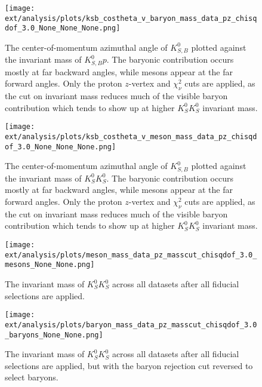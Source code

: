 \begin{figure}
  \begin{center}
    \texttt{[image: ext/analysis/plots/ksb\_costheta\_v\_baryon\_mass\_data\_pz\_chisqdof\_3.0\_None\_None\_None.png]}
  \end{center}
  \caption{The center-of-momentum azimuthal angle of $K_{S,B}^0$ plotted against the invariant mass of $K_{S,B}^0 p$. The baryonic contribution occurs mostly at far backward angles, while mesons appear at the far forward angles. Only the proton $z$-vertex and $\chi^2_\nu$ cuts are applied, as the cut on invariant mass reduces much of the visible baryon contribution which tends to show up at higher $K_S^0K_S^0$ invariant mass.}\label{fig:ksb-costheta-v-baryon-mass-data-pz-chisqdof-3.0}
\end{figure}

\begin{figure}
  \begin{center}
    \texttt{[image: ext/analysis/plots/ksb\_costheta\_v\_meson\_mass\_data\_pz\_chisqdof\_3.0\_None\_None\_None.png]}
  \end{center}
  \caption{The center-of-momentum azimuthal angle of $K_{S,B}^0$ plotted against the invariant mass of $K_S^0K_S^0$. The baryonic contribution occurs mostly at far backward angles, while mesons appear at the far forward angles. Only the proton $z$-vertex and $\chi^2_\nu$ cuts are applied, as the cut on invariant mass reduces much of the visible baryon contribution which tends to show up at higher $K_S^0K_S^0$ invariant mass.}\label{fig:ksb-costheta-v-meson-mass-data-pz-chisqdof-3.0}
\end{figure}

\begin{figure}
  \begin{center}
    \texttt{[image: ext/analysis/plots/meson\_mass\_data\_pz\_masscut\_chisqdof\_3.0\_mesons\_None\_None.png]}
  \end{center}
  \caption{The invariant mass of $K_S^0K_S^0$ across all datasets after all fiducial selections are applied.}\label{fig:meson-mass-data-pz-masscut-chisqdof-3.0-mesons}
\end{figure}

\begin{figure}
  \begin{center}
    \texttt{[image: ext/analysis/plots/baryon\_mass\_data\_pz\_masscut\_chisqdof\_3.0\_baryons\_None\_None.png]}
  \end{center}
  \caption{The invariant mass of $K_S^0K_S^0$ across all datasets after all fiducial selections are applied, but with the baryon rejection cut reversed to select baryons.}\label{fig:baryon-mass-data-pz-masscut-chisqdof-3.0-baryons}
\end{figure}

